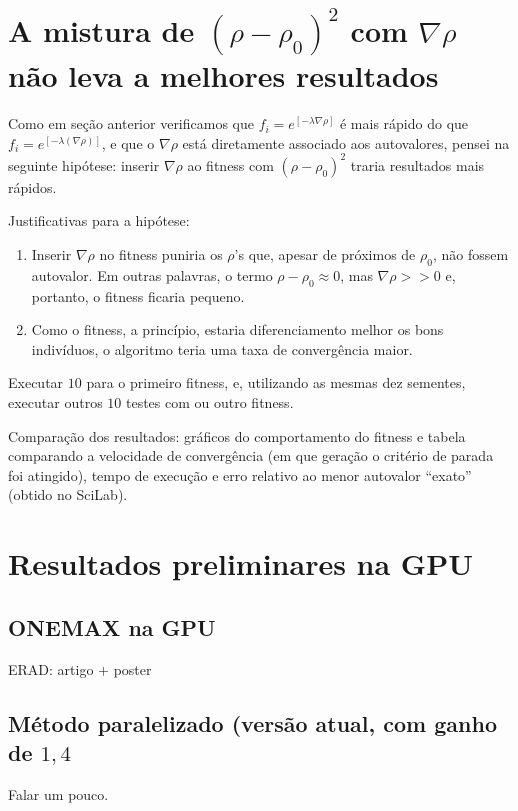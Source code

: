 	\section{A mistura de $(\rho - \rho_0)^2$ com $\nabla\rho$ não leva a melhores resultados}
	
	Como em seção anterior verificamos que $f_i = e^{[-\lambda \nabla \rho]}$ é mais rápido do que $f_i = e^{[-\lambda (\nabla \rho)]}$, e que o $\nabla\rho$ está diretamente associado aos autovalores, pensei na seguinte hipótese: inserir $\nabla \rho$ ao fitness com $(\rho - \rho_0)^2$ traria resultados mais rápidos.
	
	Justificativas para a hipótese: 
	
	\begin{enumerate}
		\item Inserir $\nabla \rho$ no fitness puniria os $\rho$'s que, apesar de próximos de $\rho_0$, não fossem autovalor. Em outras palavras, o termo $\rho - \rho_0 \approx 0$, mas $\nabla \rho >> 0$ e, portanto, o fitness ficaria pequeno.
		
		\item Como o fitness, a princípio, estaria diferenciamento melhor os bons indivíduos, o algoritmo teria uma taxa de convergência maior.
		
	\end{enumerate}
	
		Executar $10$ para o primeiro fitness, e, utilizando as mesmas dez sementes, executar outros $10$ testes com ou outro fitness.
		
		Comparação dos resultados: gráficos do comportamento do fitness e tabela comparando a velocidade de convergência (em que geração o critério de parada foi atingido), tempo de execução e erro relativo ao menor autovalor ``exato'' (obtido no SciLab).
	
	\section{Resultados preliminares na GPU}
	
		\subsection{ONEMAX na GPU}
	
				ERAD: artigo $+$ poster
				
		\subsection{Método paralelizado (versão atual, com ganho de $1,4$}
		
				Falar um pouco.
		
				